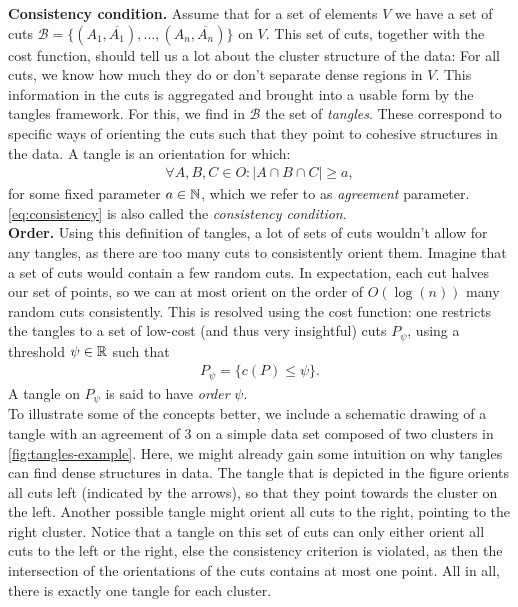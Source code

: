 \noindent
\textbf{Consistency condition.} Assume that for a set of elements $V$ we have a set of cuts 
$\mathcal{B} = \{\left( A_1, \overline{A_1}\right), \ldots, \left( A_n, \overline{A_n} \right) \}$ on $V$.
This set of cuts, together with the cost function, should tell us a lot about the cluster structure of the data:
For all cuts, we know how much they do or don't separate dense regions in $V$. 
This information in the cuts is aggregated and brought into a usable form by the tangles framework. 
For this, we find in $\mathcal{B}$ the set of \textit{tangles}.  
These correspond to specific ways of orienting the cuts such that they point to cohesive structures in the data.  
A tangle is an orientation for which:
\begin{align}\label{eq:consistency}
    \forall A,B,C \in O: \left| A \cap B \cap C \right| \ge a,
\end{align}
for some fixed parameter $a \in \mathbb{N}$, which we refer to as \textit{agreement} parameter. \autoref{eq:consistency} is also called the \textit{consistency condition}. \\

\noindent
\textbf{Order.} Using this definition of tangles, a lot of sets of cuts wouldn't allow for any tangles, as there are too many cuts to consistently orient them. 
Imagine that a set of cuts would contain a few random cuts. 
In expectation, each cut halves our set of points, so we can at most orient on the order of $O(\log(n))$ many random cuts consistently.
This is resolved using the cost function: one restricts the tangles to a set of low-cost (and thus very insightful) cuts $P_{\psi}$, using a threshold $\psi \in \mathbb{R}$ such that
\begin{align}
P_{\psi} = \{ c(P) \le \psi \}   
.\end{align}
A tangle on $P_{\psi}$ is said to have \textit{order} $\psi$. \\

\noindent
To illustrate some of the concepts better, we include a schematic drawing of a tangle with an agreement of $3$ on 
a simple data set composed of two clusters in \autoref{fig:tangles-example}. 
Here, we might already gain some intuition on why tangles can find dense structures in data. 
The tangle that is depicted in the figure orients all cuts left 
(indicated by the arrows), so that they point towards the cluster on the left. 
Another possible tangle might orient all cuts to the right, pointing to the right cluster. 
Notice that a tangle on this set of cuts can only either orient all cuts to the left or the 
right, else the consistency criterion is violated, as then the intersection of the orientations of the cuts contains at most one point. 
All in all, there is exactly one tangle for each cluster.

